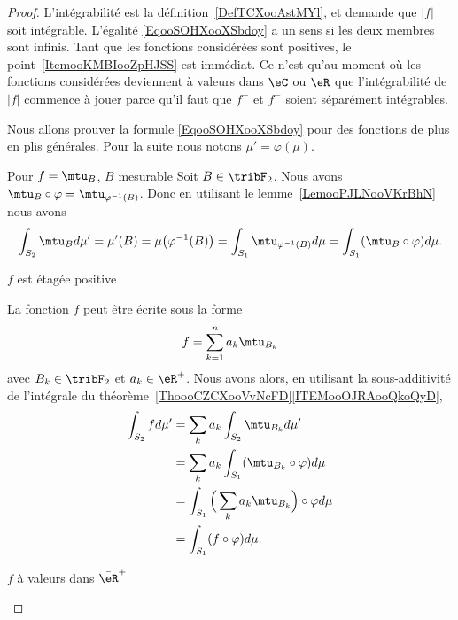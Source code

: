 \begin{proof}
    L'intégrabilité est la définition~\ref{DefTCXooAstMYl}, et demande que \( | f |\) soit intégrable. L'égalité \eqref{EqooSOHXooXSbdoy} a un sens si les deux membres sont infinis. Tant que les fonctions considérées sont positives, le point~\ref{ItemooKMBIooZpHJSS} est immédiat. Ce n'est qu'au moment où les fonctions considérées deviennent à valeurs dans \( \eC\) ou \( \eR\) que l'intégrabilité de \( | f |\) commence à jouer parce qu'il faut que \(  f^+  \) et \( f^-\) soient séparément intégrables.

    Nous allons prouver la formule \eqref{EqooSOHXooXSbdoy} pour des fonctions de plus en plis générales. Pour la suite nous notons \( \mu'=\varphi(\mu)\).

    \begin{subproof}
        \item[Pour \( f=\mtu_B\), \( B \) mesurable]
            Soit \( B\in\tribF_2 \). Nous avons \( \mtu_B\circ\varphi=\mtu_{\varphi^{-1}(B)}\). Donc en utilisant le lemme~\ref{LemooPJLNooVKrBhN} nous avons
            \begin{equation}
                \int_{S_2}\mtu_{B}d\mu'=\mu'(B)=\mu\big( \varphi^{-1}(B) \big)=\int_{S_1}\mtu_{\varphi^{-1}(B)}d\mu=\int_{S_1}(\mtu_B\circ \varphi)d\mu.
            \end{equation}
        \item[\( f\) est étagée positive]

            La fonction \( f\) peut être écrite sous la forme
            \begin{equation}
                f=\sum_{k=1}^na_k\mtu_{B_k}
            \end{equation}
            avec \( B_k\in\tribF_2\) et \( a_k\in \eR^+\). Nous avons alors, en utilisant la sous-additivité de l'intégrale du théorème~\ref{ThoooCZCXooVvNcFD}\ref{ITEMooOJRAooQkoQyD},
            \begin{subequations}
                \begin{align}
                    \int_{S_2}fd\mu'&=\sum_ka_k\int_{S_2}\mtu_{B_k}d\mu'\\
                    &=\sum_ka_k\int_{S_1}(\mtu_{B_k}\circ\varphi)d\mu\\
                    &=\int_{S_1}\Big( \sum_ka_k\mtu_{B_k} \Big)\circ \varphi d\mu\\
                    &=\int_{S_1}(f\circ\varphi)d\mu.
                \end{align}
            \end{subequations}
        \item[\( f\) à valeurs dans \( \bar \eR^+\)]


\end{subproof}
\end{proof}
